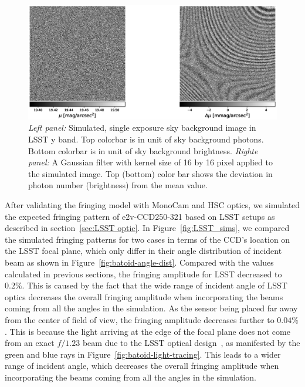\documentclass[twocolumn]{aastex63} %
\begin{document}
\begin{CJK*}{UTF8}{gbsn}
\begin{figure}[tbh]
\centering
\includegraphics[scale = 0.45]{LSST-skybg-mag-image.eps}
\caption{{\it Left panel:} Simulated, single exposure sky background image in LSST y band. Top colorbar is in unit of sky background photons. Bottom colorbar is in unit of sky background brightness. {\it Righte panel:} A Gaussian filter with kernel size of 16 by 16 pixel applied to the simulated image.  Top (bottom) color bar shows the deviation in photon number (brightness) from the mean value.}
\label{fig:lsst-image}
\end{figure}

After validating the fringing model with MonoCam and HSC optics, we simulated the expected fringing pattern of e2v-CCD250-321 based on LSST setups as described in section~\ref{sec:LSST optic}.  In Figure~\ref{fig:LSST_sims}, we compared the simulated fringing patterns for two cases in terms of the CCD's location on the LSST focal plane, which only differ in their angle distribution of incident beam as shown in Figure~\ref{fig:batoid-angle-dist}. Compared with the values calculated in previous sections, the fringing amplitude for LSST decreased to $0.2\%$. This is caused by the fact that the wide range of incident angle of LSST optics decreases the overall fringing amplitude when incorporating the beams coming from all the angles in the simulation. As the sensor being placed far away from the center of field of view, the fringing amplitude decreases further to $0.04\%$. This is because the light arriving at the edge of the focal plane does not come from an exact $f/1.23$ beam due to the LSST optical design~\citep{Olivier08}, as manifested by the green and blue rays in Figure~\ref{fig:batoid-light-tracing}. This leads to a wider range of incident angle, which decreases the overall fringing amplitude when incorporating the beams coming from all the angles in the simulation. 


\end{CJK*}
\end{document}
